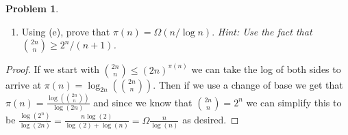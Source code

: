 \documentclass[11pt, letter]{amsart}
\theoremstyle{definition}
\newtheorem{problem}{Problem}[]
\begin{document}
\begin{problem}
\begin{enumerate}[label={(\alph*)}]
\begin{proof}
  \end{proof}
  \item Using (e), prove that $\pi(n) = \Omega(n / \log n)$.
    \textit{Hint: Use the fact that $\binom{2n}{n} \geq 2^n / (n + 1)$.}
  \end{enumerate}
  \begin{proof}
      If we start with $\binom{2n}{n} \leq (2n)^{\pi(n)}$ we can take the log of both sides to arrive at $\pi(n) = \log_{2n}(\binom{2n}{n})$. Then if we use a change of base we get that $\pi(n) = \frac{\log(\binom{2n}{n})}{\log(2n)}$ and since we know that $\binom{2n}{n} = 2^n$ we can simplify this to be $\frac{\log(2^n)}{\log(2n)} = \frac{n\log(2)}{\log(2)+\log(n)} = \Omega \frac{n}{\log(n)}$ as desired.
  \end{proof}
\end{problem}
\end{document}
